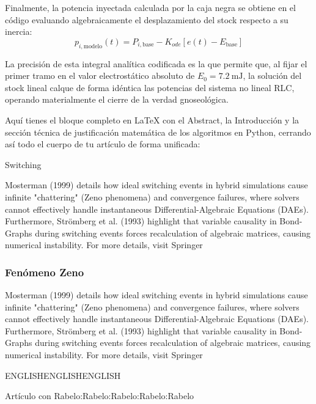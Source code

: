 \documentclass[11pt, a4paper]{article}
\theoremstyle{definition}
\theoremstyle{plain}
\theoremstyle{plain}
\theoremstyle{remark}
\theoremstyle{remark}
\theoremstyle{remark}
\begin{document}
Finalmente, la potencia inyectada calculada por la caja negra se obtiene en el código evaluando algebraicamente el desplazamiento del stock respecto a su inercia:
\begin{equation}
	p_{i,\text{modelo}}(t) = P_{i,\text{base}} - K_{ode} \left[ e(t) - E_{\text{base}} \right]
\end{equation}

La precisión de esta integral analítica codificada es la que permite que, al fijar el primer tramo en el valor electrostático absoluto de $E_0 = 7.2\ \text{mJ}$, la solución del stock lineal calque de forma idéntica las potencias del sistema no lineal RLC, operando materialmente el cierre de la verdad gnoseológica.

Aquí tienes el bloque completo en LaTeX con el Abstract, la Introducción y la sección técnica de justificación matemática de los algoritmos en Python, cerrando así todo el cuerpo de tu artículo de forma unificada:


Switching

Mosterman (1999) \cite{Mosterman1999hybrid} details how ideal switching events in hybrid simulations cause infinite "chattering" (Zeno phenomena) and convergence failures, where solvers cannot effectively handle instantaneous Differential-Algebraic Equations (DAEs). Furthermore, Strömberg et al. (1993) \cite{Stromberg1993variable} highlight that variable causality in Bond-Graphs during switching events forces recalculation of algebraic matrices, causing numerical instability. For more details, visit Springer



\subsubsection*{Fenómeno Zeno}

Mosterman (1999) \cite{Mosterman1999hybrid} details how ideal switching events in hybrid simulations cause infinite "chattering" (Zeno phenomena) and convergence failures, where solvers cannot effectively handle instantaneous Differential-Algebraic Equations (DAEs). Furthermore, Strömberg et al. (1993) \cite{Stromberg1993variable} highlight that variable causality in Bond-Graphs during switching events forces recalculation of algebraic matrices, causing numerical instability. For more details, visit Springer



ENGLISHENGLISHENGLISH

Artículo con Rabelo:Rabelo:Rabelo:Rabelo:Rabelo
\end{document}
